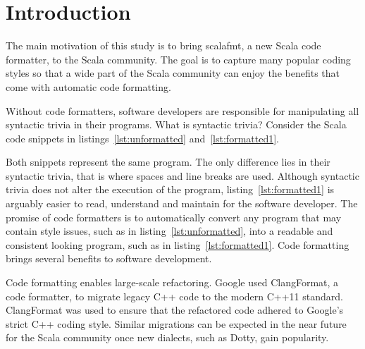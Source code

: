 
\section{Introduction} %
\label{sec:Introduction}
\lstset{style=scala}
The main motivation of this study is to bring scalafmt, a new Scala code formatter, to the Scala community.
The goal is to capture many popular coding styles so that a wide part of the Scala community can enjoy the benefits that come with automatic code formatting.

Without code formatters, software developers are responsible for manipulating all syntactic trivia in their programs.
What is syntactic trivia?
Consider the Scala code snippets in listings~\ref{lst:unformatted} and~\ref{lst:formatted1}.

\begin{minipage}{.45\textwidth}

\end{minipage}
\hfil
\begin{minipage}{.45\textwidth}

\end{minipage}

Both snippets represent the same program.
The only difference lies in their syntactic trivia, that is where spaces and line breaks are used.
Although syntactic trivia does not alter the execution of the program, listing~\ref{lst:formatted1} is arguably easier to read, understand and maintain for the software developer.
The promise of code formatters is to automatically convert any program that may contain style issues, such as in listing~\ref{lst:unformatted}, into a readable and consistent looking program, such as in listing~\ref{lst:formatted1}.
Code formatting brings several benefits to software development.

Code formatting enables large-scale refactoring.
Google used ClangFormat\autocite{jasper_clangformat_2013}, a code formatter, to migrate legacy C++ code to the modern C++11 standard\autocite{wright_large-scale_2013}.
ClangFormat was used to ensure that the refactored code adhered to Google's strict C++ coding style\autocite{_google_????}.
Similar migrations can be expected in the near future for the Scala community once new dialects, such as Dotty\autocite{rompf_f_2015}, gain popularity.

